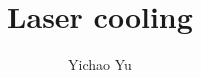 \documentclass{beamer}
\title{Laser cooling}
\date{}
\author{Yichao Yu}
\institute{Journal Club}
\begin{document}
{
  \begin{frame}{}
    \titlepage
  \end{frame}
}
\end{document}
